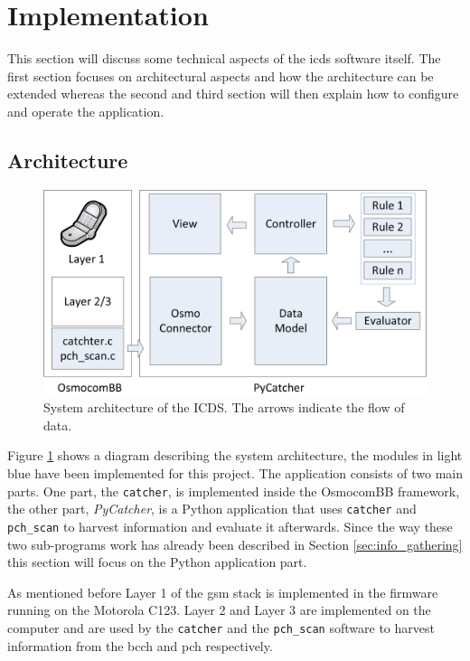 \section{Implementation}
\label{sec:icds}
This section will discuss some technical aspects of the \gls{icds} software itself.
The first section focuses on architectural aspects and how the architecture can be extended whereas the second and third section will then explain how to configure and operate the application.

\subsection{Architecture}
\begin{figure}
\centering
\includegraphics{../Images/Architecture_software}
\caption{System architecture of the ICDS. The arrows indicate the flow of data.}
\label{fig:architecture}
\end{figure}
Figure \ref{fig:architecture} shows a diagram describing the system architecture, the modules in light blue have been implemented for this project.
The application consists of two main parts.
One part, the \texttt{catcher}, is implemented inside the OsmocomBB framework, the other part, \emph{PyCatcher}, is a Python application that uses \texttt{catcher} and \texttt{pch\_scan} to harvest information and evaluate it afterwards.
Since the way these two sub-programs work has already been described in Section \ref{sec:info_gathering} this section will focus on the Python application part.

As mentioned before Layer 1 of the \gls{gsm} stack is implemented in the firmware running on the Motorola C123.
Layer 2 and Layer 3 are implemented on the computer and are used by the \texttt{catcher} and the \texttt{pch\_scan} software to harvest information from the \gls{bcch} and \gls{pch} respectively.

